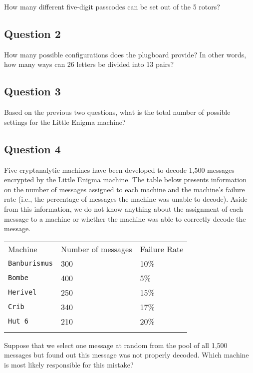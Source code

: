 \documentclass[]{article}
\begin{document}
How many different five-digit passcodes can be set out of the 5 rotors?

\subsection{Question 2}\label{question-2}

How many possible configurations does the plugboard provide? In other
words, how many ways can 26 letters be divided into 13 pairs?

\subsection{Question 3}\label{question-3}

Based on the previous two questions, what is the total number of
possible settings for the Little Enigma machine?

\subsection{Question 4}\label{question-4}

Five cryptanalytic machines have been developed to decode 1,500 messages
encrypted by the Little Enigma machine. The table below presents
information on the number of messages assigned to each machine and the
machine's failure rate (i.e., the percentage of messages the machine was
unable to decode). Aside from this information, we do not know anything
about the assignment of each message to a machine or whether the machine
was able to correctly decode the message.

\begin{longtable}[c]{@{}lll@{}}
\toprule\addlinespace
Machine & Number of messages & Failure Rate
\\\addlinespace
\midrule\endhead
\texttt{Banburismus} & 300 & 10\%
\\\addlinespace
\texttt{Bombe} & 400 & 5\%
\\\addlinespace
\texttt{Herivel} & 250 & 15\%
\\\addlinespace
\texttt{Crib} & 340 & 17\%
\\\addlinespace
\texttt{Hut 6} & 210 & 20\%
\\\addlinespace
\bottomrule
\end{longtable}

Suppose that we select one message at random from the pool of all 1,500
messages but found out this message was not properly decoded. Which
machine is most likely responsible for this mistake?
\end{document}
